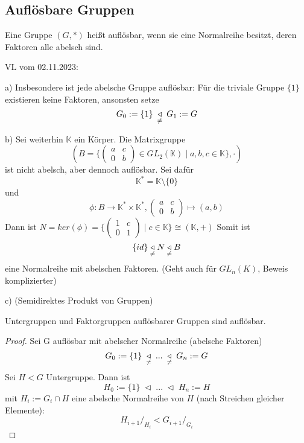 \documentclass[../main.tex]{subfiles}
\begin{document}
\subsection{Auflösbare Gruppen}
\begin{definition}
    Eine Gruppe $(G,*)$ heißt auflösbar, wenn sie eine Normalreihe besitzt, deren Faktoren alle abelsch sind.
\end{definition}
\begin{flushright}
VL vom 02.11.2023:
\end{flushright}
\begin{example}
    a) Insbesondere ist jede abelsche Gruppe auflösbar: Für die triviale Gruppe $\{1\}$ existieren keine Faktoren, ansonsten setze $$G_0 := \{1\} \; \underset{\neq}{\triangleleft} \; G_1 := G$$

    b) Sei weiterhin $\mathbb{K}$ ein Körper. Die Matrixgruppe $$(B = \{\begin{pmatrix} a & c \\ 0 & b \end{pmatrix} \in GL_2(\mathbb{K}) \mid a,b,c \in \mathbb{K}\}, \cdot)$$ ist nicht abelsch, aber dennoch auflösbar. Sei dafür $$\mathbb{K}^* = \mathbb{K}\setminus\{0\}$$ und $$\phi: B \rightarrow \mathbb{K}^* \times \mathbb{K}^*, \begin{pmatrix} a & c \\ 0 & b
    \end{pmatrix} \mapsto (a,b)$$ Dann ist $N = ker(\phi) = \{\begin{pmatrix}
        1 & c \\ 0 & 1
    \end{pmatrix} \mid c \in \mathbb{K}\} \cong (\mathbb{K},+)$ Somit ist $$\{id\} \underset{\neq}{\triangleleft} N \underset{\neq}{\triangleleft} B$$ eine Normalreihe mit abelschen Faktoren. (Geht auch für $GL_n(K)$, Beweis komplizierter)

    c) (Semidirektes Produkt von Gruppen) \TODO
\end{example}
\begin{theorem}\label{thm:ug:aufloesbar}
    Untergruppen und Faktorgruppen auflösbarer Gruppen sind auflösbar.
\end{theorem}
\begin{proof}
    Sei G auflösbar mit abelscher Normalreihe (abelsche Faktoren) 
    $$G_0 := \{1\} \; \underset{\neq}{\triangleleft} \; ... \; \underset{\neq}{\triangleleft} \; G_n := G$$
    Sei $H < G$ Untergruppe. Dann ist $$H_0 := \{1\} \; \triangleleft \; ... \; \triangleleft \; H_n := H$$ mit $H_i := G_i \cap H$ eine abelsche Normalreihe von $H$ (nach Streichen gleicher Elemente):
    $$H_{i+1}/_{H_i} < G_{i+1}/_{G_i}$$
\end{proof}
\end{document}

